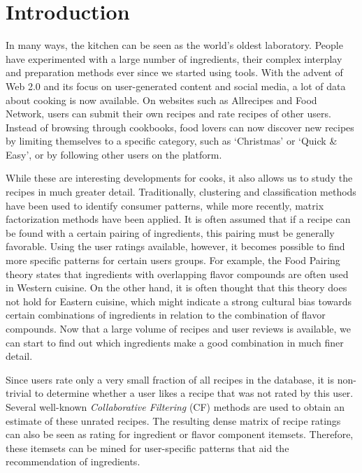 \section{Introduction}
\label{sec:introduction}

In many ways, the kitchen can be seen as the world's oldest laboratory.
People have experimented with a large number of ingredients, their complex interplay and preparation methods ever since we started using tools.
With the advent of Web 2.0 and its focus on user-generated content and social media, a lot of data about cooking is now available.
On websites such as Allrecipes and Food Network, users can submit their own recipes and rate recipes of other users.
Instead of browsing through cookbooks, food lovers can now discover new recipes by limiting themselves to a specific category, such as `Christmas' or `Quick \& Easy', or by following other users on the platform.

While these are interesting developments for cooks, it also allows us to study the recipes in much greater detail.
Traditionally, clustering and classification methods have been used to identify consumer patterns, while more recently, matrix factorization methods have been applied.
It is often assumed that if a recipe can be found with a certain pairing of ingredients, this pairing must be generally favorable.
Using the user ratings available, however, it becomes possible to find more specific patterns for certain users groups.
For example, the Food Pairing theory states that ingredients with overlapping flavor compounds are often used in Western cuisine.
On the other hand, it is often thought that this theory does not hold for Eastern cuisine, which might indicate a strong cultural bias towards certain combinations of ingredients in relation to the combination of flavor compounds.
Now that a large volume of recipes and user reviews is available, we can start to find out which ingredients make a good combination in much finer detail.

Since users rate only a very small fraction of all recipes in the database, it is non-trivial to determine whether a user likes a recipe that was not rated by this user.
Several well-known \emph{Collaborative Filtering} (CF) methods are used to obtain an estimate of these unrated recipes.
The resulting dense matrix of recipe ratings can also be seen as rating for ingredient or flavor component itemsets.
Therefore, these itemsets can be mined for user-specific patterns that aid the recommendation of ingredients.

